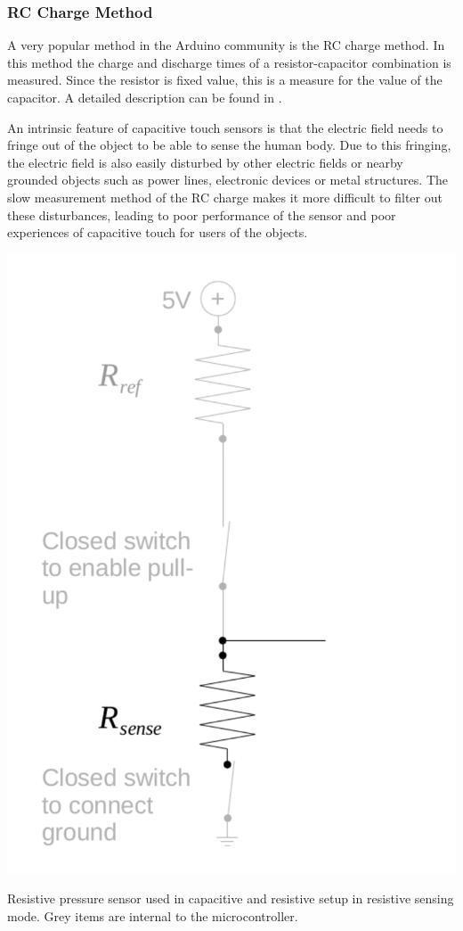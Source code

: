 \documentclass{sigchi-ext}
\begin{document}
\subsubsection{RC Charge Method}
A very popular method in the Arduino community is the RC charge
method. In this method the charge and discharge times of a resistor-capacitor
combination is measured. Since the resistor is fixed value, this is a measure
for the value of the capacitor. A detailed description can be found in
\cite{ST2009}.



An intrinsic feature of capacitive touch sensors is that the electric field needs to fringe out of the object to be able to sense the human body. Due to this fringing, the electric field is also easily disturbed by other electric fields or nearby grounded objects such as power lines, electronic devices or metal structures. The slow measurement method of the RC charge makes it more difficult to filter out these disturbances, leading to poor performance of the sensor and poor experiences of capacitive touch for users of the objects. 

\begin{marginfigure}
\begin{minipage}{\marginparwidth}
\centering
\includegraphics[width=0.9\columnwidth]{figures/cap_res_setup_res}
\caption{Resistive pressure sensor used in capacitive and resistive setup in
resistive sensing mode. Grey items are internal to the
microcontroller.}~\label{fig:cap_res_setup_res}
\end{minipage}
\end{marginfigure}
\end{document}
